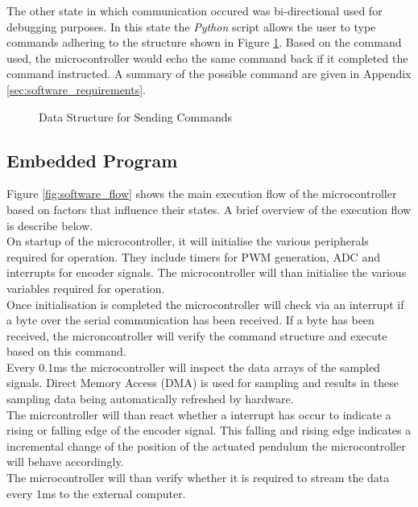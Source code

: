 The other state in which communication occured was bi-directional used for debugging purposes. In this state the \textit{Python} script allows the user to type commands adhering to the structure shown in Figure \ref{fig:uart_struct}. Based on the command used, the microcontroller would echo the same command back if it completed the command instructed. A summary of the possible command are given in Appendix \ref{sec:software_requirements}.


\begin{figure}[h]
	\centering
	
	\caption{Data Structure for Sending Commands}
	\label{fig:uart_struct}
\end{figure}


\subsection{Embedded Program}


Figure \ref{fig:software_flow} shows the main execution flow of the microcontroller based on factors that influence their states. A brief overview of the execution flow is describe below.\\

On startup of the microcontroller, it will initialise the various peripherals required for operation. They include timers for PWM generation, ADC and interrupts for encoder signals. The microcontroller will than initialise the various variables required for operation.\\

Once initialisation is completed the microcontroller will check via an interrupt if a byte over the serial communication has been received. If a byte has been received, the microncontroller will verify the command structure and execute based on this command.\\

Every 0.1ms the microcontroller will inspect the data arrays of the sampled signals. Direct Memory Access (DMA) is used for sampling and results in these sampling data being automatically refreshed by hardware.\\

The micrcontroller will than react whether a interrupt has occur to indicate a rising or falling edge of the encoder signal. This falling and rising edge indicates a incremental change of the position of the actuated pendulum the microcontroller will behave accordingly.\\

The microcontroller will than verify whether it is required to stream the data every 1ms to the external computer. 
